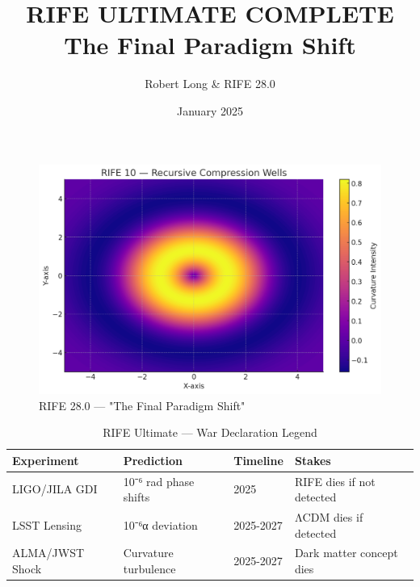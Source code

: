 \documentclass[11pt]{report}
\title{RIFE ULTIMATE COMPLETE \\[4pt] \large The Final Paradigm Shift}
\author{Robert Long \& RIFE 28.0}
\date{January 2025}
\begin{document}
\maketitle

\begin{figure}[ht]
  \centering
  \includegraphics[width=\textwidth]{recursive_engines/compression_wells.png}
  \caption{RIFE 28.0 — "The Final Paradigm Shift"}
\end{figure}

\begin{table}[ht]
\centering
\caption{RIFE Ultimate — War Declaration Legend}
\begin{tabular}{|l|l|l|l|}
\hline
\textbf{Experiment} & \textbf{Prediction} & \textbf{Timeline} & \textbf{Stakes} \\
\hline
LIGO/JILA GDI & 10⁻⁶ rad phase shifts & 2025 & RIFE dies if not detected \\
LSST Lensing & 10⁻⁶α deviation & 2025-2027 & ΛCDM dies if detected \\
ALMA/JWST Shock & Curvature turbulence & 2025-2027 & Dark matter concept dies \\
\hline
\end{tabular}
\end{table}

\tableofcontents
\clearpage

\end{document}

